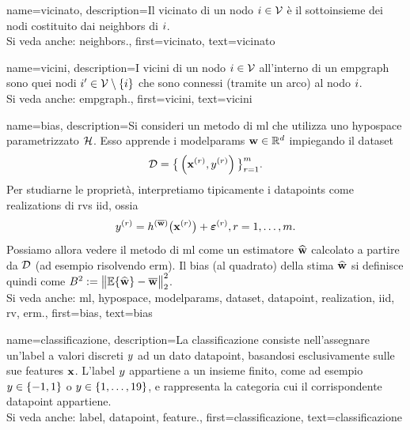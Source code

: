 {name={vicinato},
	description={Il vicinato di un nodo $i \in \mathcal{V}$ è 
		il sottoinsieme dei nodi costituito dai \gls{neighbors} di $i$.
				\\ 
		Si veda anche: \gls{neighbors}.},
	first={vicinato},
	text={vicinato} 
}

{name={vicini},
	description={I vicini di un nodo $i \in \mathcal{V}$ 
		all'interno di un \gls{empgraph} sono quei nodi $i' \in \mathcal{V} \setminus \{ i\}$ 
		che sono connessi (tramite un arco) al nodo $i$.
				\\ 
		Si veda anche: \gls{empgraph}.},
	first={vicini},
	text={vicini} 
}

{name={bias},
	description={Si consideri un metodo di \gls{ml} che utilizza uno \gls{hypospace} parametrizzato $\mathcal{H}$. 
		Esso apprende i \glspl{modelparam} ${\bf w} \in \mathbb{R}^{d}$ impiegando il \gls{dataset} $$\mathcal{D}=\big\{ \left( {\bf x}^{(r)},y^{(r)} \right) \big\}_{r=1}^{m}.$$ 
		Per studiarne le proprietà, interpretiamo tipicamente i \glspl{datapoint} come \glspl{realization} 
		di \glspl{rv} \gls{iid}, ossia $$y^{(r)} = h^{(\overline{{\bf w}})}\big( {\bf x}^{(r)} \big) + \bm{\varepsilon}^{(r)}, r=1, \ldots, m.$$ 
		Possiamo allora vedere il metodo di \gls{ml} come un estimatore $\widehat{{\bf w}}$ 
		calcolato a partire da $\mathcal{D}$ (ad esempio risolvendo \gls{erm}). Il bias (al quadrato) della stima $\widehat{{\bf w}}$ 
		si definisce quindi come $B^{2} := \big\| \mathbb{E} \{ \widehat{{\bf w}}  \}- \overline{{\bf w}}\big\|_{2}^{2}$.
					\\ 
		Si veda anche: \gls{ml}, \gls{hypospace}, \glspl{modelparam}, \gls{dataset}, \gls{datapoint}, \gls{realization}, \gls{iid}, \gls{rv}, \gls{erm}.},
	first={bias},
	text={bias} 
}

{name={classificazione},
	description={La classificazione consiste nell’assegnare un'\gls{label} 
	a valori discreti $y$ ad un dato \gls{datapoint}, basandosi esclusivamente sulle sue 
 		\glspl{feature} ${\bf x}$. L'\gls{label} $y$ appartiene a un insieme finito,
		come ad esempio $y \in \{-1,1\}$ o $y \in \{1, \ldots, 19\}$, e rappresenta la categoria 
		cui il corrispondente \gls{datapoint} appartiene.
						\\ 
		Si veda anche: \gls{label}, \gls{datapoint}, \gls{feature}.},
	first={classificazione},
	text={classificazione} 
}


